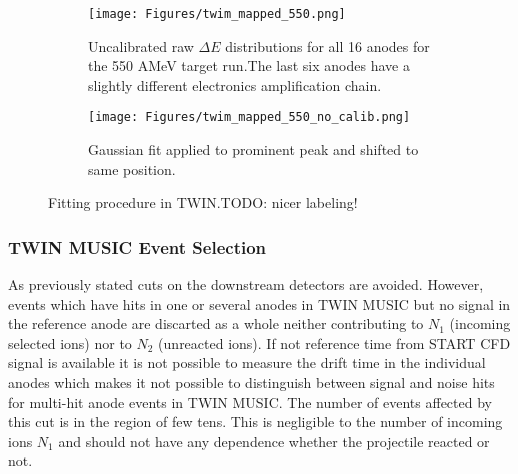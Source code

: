 \begin{figure}
     \centering
     \begin{subfigure}[t]{0.45\textwidth}
         \centering
         \texttt{[image: Figures/twim\_mapped\_550.png]}
         \caption{Uncalibrated raw $\Delta E$ distributions for all 16 anodes for the 550 AMeV target run.The last six anodes have a slightly different electronics amplification chain.}
         \label{fig:raw_twim}
     \end{subfigure}
     \hfill
     \begin{subfigure}[t]{0.45\textwidth}
         \centering
         \texttt{[image: Figures/twim\_mapped\_550\_no\_calib.png]}
         \caption{Gaussian fit applied to prominent peak and shifted to same position.}
         \label{fig:cal_twim_one}
     \end{subfigure}
     \hfill
        \caption{Fitting procedure in TWIN.TODO: nicer labeling!}
        \label{fig:calibration}
\end{figure}
\subsubsection{TWIN MUSIC Event Selection}
As previously stated cuts on the downstream detectors are avoided. However, events which have hits in one or several anodes in TWIN MUSIC but no signal in the reference anode are discarted as a whole neither contributing to $N_1$ (incoming selected ions) nor to $N_2$ (unreacted ions). If not reference time from START CFD signal is available it is not possible to measure the drift time in the individual anodes which makes it not possible to distinguish between signal and noise hits for multi-hit anode events in TWIN MUSIC. The number of events affected by this cut is in the region of few tens. This is negligible to the number of incoming ions $N_1$ and should not have any dependence whether the projectile reacted or not. 
